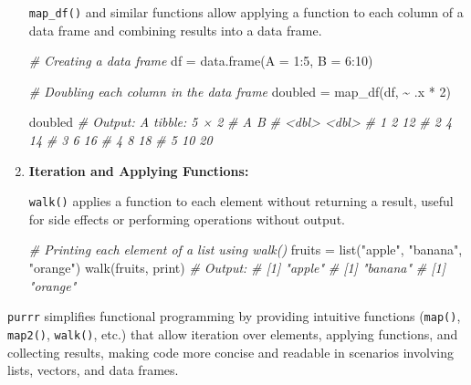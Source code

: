 \documentclass[
]{article}
\newenvironment{Shaded}{}{}
\newcommand{\AttributeTok}[1]{\textcolor[rgb]{0.49,0.56,0.16}{#1}}
\newcommand{\CommentTok}[1]{\textcolor[rgb]{0.38,0.63,0.69}{\textit{#1}}}
\newcommand{\DecValTok}[1]{\textcolor[rgb]{0.25,0.63,0.44}{#1}}
\newcommand{\FunctionTok}[1]{\textcolor[rgb]{0.02,0.16,0.49}{#1}}
\newcommand{\NormalTok}[1]{#1}
\newcommand{\OtherTok}[1]{\textcolor[rgb]{0.00,0.44,0.13}{#1}}
\newcommand{\SpecialCharTok}[1]{\textcolor[rgb]{0.25,0.44,0.63}{#1}}
\newcommand{\StringTok}[1]{\textcolor[rgb]{0.25,0.44,0.63}{#1}}
\begin{document}
\begin{enumerate}
  \texttt{map\_df()} and similar functions allow applying a function to
  each column of a data frame and combining results into a data frame.

\begin{Shaded}
\begin{Highlighting}[]
 \CommentTok{\# Creating a data frame}
\NormalTok{ df }\OtherTok{=} \FunctionTok{data.frame}\NormalTok{(}\AttributeTok{A =} \DecValTok{1}\SpecialCharTok{:}\DecValTok{5}\NormalTok{, }\AttributeTok{B =} \DecValTok{6}\SpecialCharTok{:}\DecValTok{10}\NormalTok{)}

 \CommentTok{\# Doubling each column in the data frame}
\NormalTok{ doubled }\OtherTok{=} \FunctionTok{map\_df}\NormalTok{(df, }\SpecialCharTok{\textasciitilde{}}\NormalTok{ .x }\SpecialCharTok{*} \DecValTok{2}\NormalTok{)}

\NormalTok{ doubled}
 \CommentTok{\# Output: A tibble: 5 × 2}
 \CommentTok{\#       A     B}
 \CommentTok{\#   \textless{}dbl\textgreater{} \textless{}dbl\textgreater{}}
 \CommentTok{\# 1     2    12}
 \CommentTok{\# 2     4    14}
 \CommentTok{\# 3     6    16}
 \CommentTok{\# 4     8    18}
 \CommentTok{\# 5    10    20}
\end{Highlighting}
\end{Shaded}
\item
  \textbf{Iteration and Applying Functions:}

  \texttt{walk()} applies a function to each element without returning a
  result, useful for side effects or performing operations without
  output.

\begin{Shaded}
\begin{Highlighting}[]
\CommentTok{\# Printing each element of a list using walk()}
\NormalTok{fruits }\OtherTok{=} \FunctionTok{list}\NormalTok{(}\StringTok{"apple"}\NormalTok{, }\StringTok{"banana"}\NormalTok{, }\StringTok{"orange"}\NormalTok{)}
\FunctionTok{walk}\NormalTok{(fruits, print)}
\CommentTok{\# Output:}
\CommentTok{\# [1] "apple"}
\CommentTok{\# [1] "banana"}
\CommentTok{\# [1] "orange"}
\end{Highlighting}
\end{Shaded}
\end{enumerate}

\texttt{purrr} simplifies functional programming by providing intuitive
functions (\texttt{map()}, \texttt{map2()}, \texttt{walk()}, etc.) that
allow iteration over elements, applying functions, and collecting
results, making code more concise and readable in scenarios involving
lists, vectors, and data frames.
\end{document}
